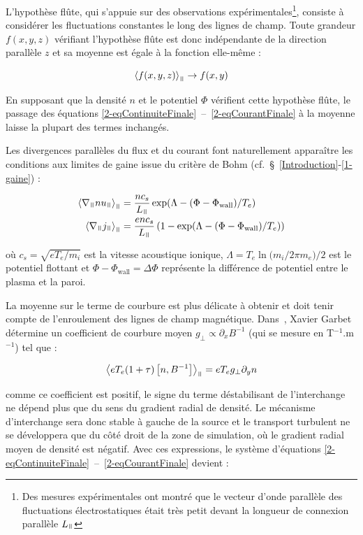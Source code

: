 \begin{refsection}
 L'hypothèse flûte, qui s'appuie sur des observations
expérimentales\footnote{Des mesures expérimentales ont montré que le vecteur
d'onde parallèle des fluctuations électrostatiques était très petit devant la
longueur de connexion parallèle $L_\para$\parencite{Wootton}}, consiste à
considérer les fluctuations constantes le long des lignes de champ. Toute
grandeur $f(x,y,z)$ vérifiant l'hypothèse flûte est donc indépendante de la
direction parallèle $z$ et sa moyenne est égale à la fonction elle-même :

\begin{equation}
\left<f(x,y,z)\right>_\para\rightarrow f(x,y)
\end{equation}

En supposant que la densité $n$ et le potentiel $\Phi$ vérifient cette hypothèse
flûte, le passage des équations
\eqref{2-eqContinuiteFinale}~--~\eqref{2-eqCourantFinale} à la moyenne laisse la plupart des termes inchangés.

Les divergences parallèles du flux et du
courant font naturellement apparaître
les conditions aux limites de gaine issue du critère de Bohm
(cf.~\S~\ref{Introduction}-\ref{1-gaine}) :

\begin{align}
\left<\nabla_\para
nu_\para\right>_\para&=\frac{nc_s}{L_\para}\exp(\Lambda-(\Phi-\Phi_\text{wall})/T_e)
\\
\left<\nabla_\para
j_\para\right>_\para&=\frac{enc_s}{L_\para}\left(1-\exp(\Lambda-(\Phi-\Phi_\text{wall})/T_e)\right)
\end{align}

où $c_s=\sqrt{eT_e/m_i}$ est la vitesse acoustique
ionique, $\Lambda=T_{e}\ln({m_{i}/2\pi m_{e})/2}$ est le
potentiel flottant et $\Phi-\Phi_\text{wall}=\Delta \Phi$ représente la
différence de potentiel entre le plasma et la paroi. 

La moyenne sur le terme de courbure est plus délicate à obtenir et doit tenir
compte de l'enroulement des lignes de champ magnétique.
Dans~\parencite{Garbet}, Xavier Garbet détermine un coefficient de courbure
moyen $g_\perp\propto\partial_xB^{-1}$ (qui se mesure en T$^{-1}$.m$^{-1}$) tel
que :

\begin{equation}
\left<eT_e(1+\tau)\left[n,B^{-1}\right]\right>_\para=eT_eg_\perp\partial_yn
\end{equation}

comme ce coefficient est positif, le signe du terme déstabilisant
de l'interchange ne dépend plus que du sens du gradient
radial de densité. Le mécanisme d'interchange sera donc stable à gauche de la
source et le transport turbulent ne se développera que du côté droit de la zone
de simulation, où le gradient radial moyen de densité est négatif.
Avec ces expressions, le système d'équations \eqref{2-eqContinuiteFinale}~--~\eqref{2-eqCourantFinale} devient :


\end{refsection}
